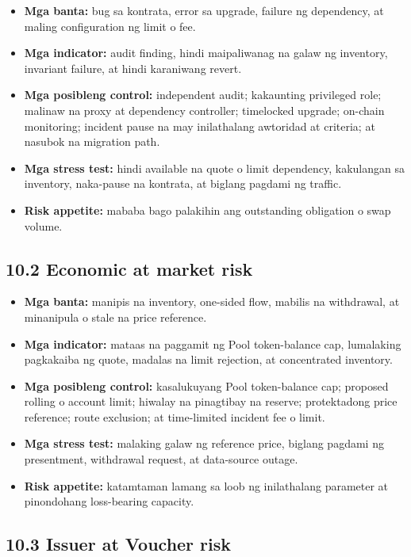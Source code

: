 \documentclass[11pt]{article}
\begin{document}
\begin{itemize}[leftmargin=*]
\item \textbf{Mga banta:} bug sa kontrata, error sa upgrade, failure ng dependency, at maling configuration ng limit o fee.
\item \textbf{Mga indicator:} audit finding, hindi maipaliwanag na galaw ng inventory, invariant failure, at hindi karaniwang revert.
\item \textbf{Mga posibleng control:} independent audit; kakaunting privileged role; malinaw na proxy at dependency controller; timelocked upgrade; on-chain monitoring; incident pause na may inilathalang awtoridad at criteria; at nasubok na migration path.
\item \textbf{Mga stress test:} hindi available na quote o limit dependency, kakulangan sa inventory, naka-pause na kontrata, at biglang pagdami ng traffic.
\item \textbf{Risk appetite:} mababa bago palakihin ang outstanding obligation o swap volume.
\end{itemize}
\subsection*{10.2 Economic at market risk}

\begin{itemize}[leftmargin=*]
\item \textbf{Mga banta:} manipis na inventory, one-sided flow, mabilis na withdrawal, at minanipula o stale na price reference.
\item \textbf{Mga indicator:} mataas na paggamit ng Pool token-balance cap, lumalaking pagkakaiba ng quote, madalas na limit rejection, at concentrated inventory.
\item \textbf{Mga posibleng control:} kasalukuyang Pool token-balance cap; proposed rolling o account limit; hiwalay na pinagtibay na reserve; protektadong price reference; route exclusion; at time-limited incident fee o limit.
\item \textbf{Mga stress test:} malaking galaw ng reference price, biglang pagdami ng presentment, withdrawal request, at data-source outage.
\item \textbf{Risk appetite:} katamtaman lamang sa loob ng inilathalang parameter at pinondohang loss-bearing capacity.
\end{itemize}
\subsection*{10.3 Issuer at Voucher risk}
\end{document}
